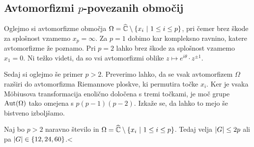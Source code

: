 

\subsection{Avtomorfizmi \texorpdfstring{$p$}{p}-povezanih območij}

Oglejmo si avtomorfizme območja
$\Omega = \widehat{\mathbb{C}} \setminus \left\{x_i~\middle\vert~1 \leq i \leq p\right\}$, pri čemer
brez škode za splošnost vzamemo $x_p = \infty$. Za $p = 1$ dobimo
kar kompleksno ravnino, katere avtomorfizme že poznamo. Pri $p = 2$
lahko brez škode za splošnost vzamemo $x_1 = 0$. Ni težko videti,
da so vsi avtomorfizmi oblike
$z \mapsto e^{i \theta} \cdot z^{\pm 1}$.

Sedaj si oglejmo še primer $p > 2$. Preverimo lahko, da se vsak
avtomorfizem $\Omega$ razširi do avtomorfizma Riemannove ploskve,
ki permutira točke $x_i$. Ker je vsaka Möbiusova transformacija
enolično določena s tremi točkami, je moč grupe $\operatorname{Aut}(\Omega)$ tako
omejena s $p (p-1) (p-2)$. Izkaže se, da lahko to mejo še bistveno
izboljšamo.

\begin{trditev}
Naj bo $p > 2$ naravno število in
$\Omega = \widehat{\mathbb{C}} \setminus \left\{x_i~\middle\vert~1 \leq i \leq p\right\}$. Tedaj velja
$\left\lvert G\right\rvert \leq 2p$ ali pa $\left\lvert G\right\rvert \in \left\{12, 24, 60\right\}$.<
\end{trditev}

